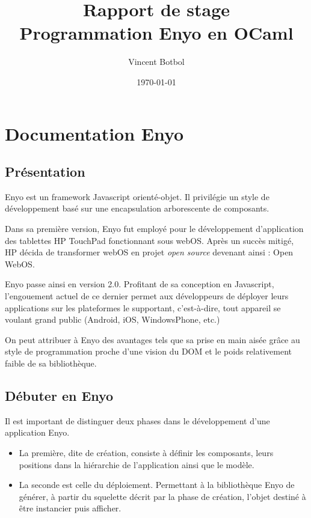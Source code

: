 \documentclass[11pt,a4paper]{report}
\title{Rapport de stage\\Programmation Enyo en OCaml}
\author{Vincent Botbol}
\date\today
\begin{document}
\maketitle
\tableofcontents

\chapter{Documentation Enyo}
\section{Présentation}
Enyo est un framework Javascript orienté-objet. Il privilégie un style de développement basé
sur une encapsulation arborescente de composants.\medskip

Dans sa première version, Enyo fut employé pour le développement d'application des 
tablettes HP TouchPad fonctionnant sous webOS. Après un succès mitigé,
HP décida de transformer webOS en projet \emph{open source} devenant ainsi : Open WebOS.\medskip

Enyo passe ainsi en version 2.0. Profitant de sa conception en Javascript, 
l'engouement actuel de ce dernier permet aux développeurs de déployer leurs 
applications sur les plateformes le supportant, c'est-à-dire, tout appareil se voulant
grand public (Android, iOS, WindowsPhone, etc.)\medskip

On peut attribuer à Enyo des avantages tels que sa prise en main aisée grâce au style 
de programmation proche d'une vision du DOM et le poids relativement faible de sa bibliothèque.

\clearpage

\section{Débuter en Enyo}

Il est important de distinguer deux phases dans le développement d'une application 
Enyo.
\begin{itemize}
\item La première, dite de création, consiste à définir les composants, leurs positions dans 
la hiérarchie de l'application ainsi que le modèle. 
\item La seconde est celle du déploiement. Permettant à la bibliothèque Enyo de 
générer, à partir du squelette décrit par la phase de création, l'objet destiné
à être instancier puis afficher.
\end{itemize}\medskip
\end{document}

